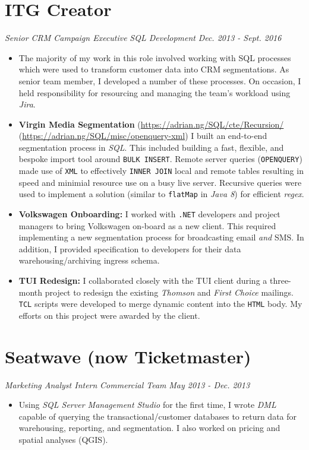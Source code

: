 \documentclass[letterpaper,11pt]{article}
\begin{document}
\section{ITG Creator}
\textit{Senior CRM Campaign Executive}
\hfill
\textit{SQL Development}
\hfill
\textit{Dec. 2013 - Sept. 2016}
\begin{itemize}
	\item[]{
	      The majority of my work in this role involved working with SQL processes which were used to transform customer data into CRM segmentations. As senior team member, I developed a number of these processes. On occasion, I held responsibility for resourcing and managing the team's workload using \textit{Jira}.
	      }
	\item
	      {
	      \textbf{Virgin Media Segmentation}
	      \hfill
	      \tiny
	      (\href{https://adrian.ng/SQL/cte/Recursion/}{https://adrian.ng/SQL/cte/Recursion/}
	      \quad
	      (\href{https://adrian.ng/SQL/misc/openquery-xml}{https://adrian.ng/SQL/misc/openquery-xml})
	      \newline
	      \small
	      I built an end-to-end segmentation process in \textit{SQL}. This included building a fast, flexible, and bespoke import tool around \texttt{BULK INSERT}. Remote server queries (\texttt{OPENQUERY}) made use of \texttt{XML} to effectively \texttt{INNER JOIN} local and remote tables resulting in speed and minimial resource use on a busy live server. Recursive queries were used to implement a solution (similar to \texttt{flatMap} in \textit{Java 8}) for efficient \textit{regex}.
	      }
	\item
	      {
	      \textbf{Volkswagen Onboarding:}
	      I worked with \texttt{.NET} developers and project managers to bring Volkswagen on-board as a new client. This required implementing a new segmentation process for broadcasting email \textit{and} SMS. In addition, I provided specification to developers for their data warehousing/archiving ingress schema.
	      }
	\item
	      {
	      \textbf{TUI Redesign:}
	      I collaborated closely with the TUI client during a three-month project to redesign the existing \textit{Thomson} and \textit{First Choice} mailings.	\texttt{TCL} scripts were developed to merge dynamic content into the \texttt{HTML} body. My efforts on this project were awarded by the client.
	      }
\end{itemize}
\section{Seatwave (now Ticketmaster)}
\textit{Marketing Analyst Intern}
\hfill
\textit{Commercial Team}
\hfill
\textit{May 2013 - Dec. 2013}
\begin{itemize}
	\item[]{
	      Using \textit{SQL Server Management Studio} for the first time, I wrote \textit{DML} capable of querying the transactional/customer databases to return data for warehousing, reporting, and segmentation. I also worked on pricing and spatial analyses (QGIS).
	      }
\end{itemize}
\end{document}
